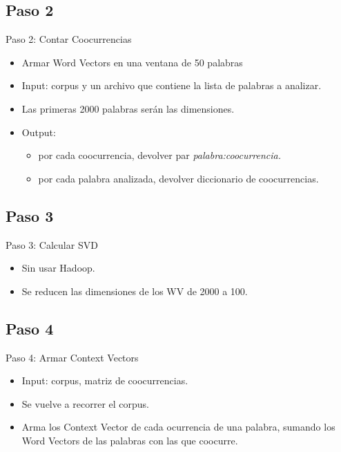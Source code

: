 \documentclass[xcolor=x11names,compress]{beamer}
\renewcommand{\(}{\begin{columns}}
\renewcommand{\)}{\end{columns}}
\newcommand{\<}[1]{\begin{column}{#1}}
\renewcommand{\>}{\end{column}}
\begin{document}
\subsection{Paso 2}
\begin{frame}{Paso 2: Contar Coocurrencias}
\begin{itemize}
\item Armar Word Vectors en una ventana de 50 palabras
\item Input: corpus y un archivo que contiene la lista de palabras a analizar.
\item Las primeras 2000 palabras serán las dimensiones.
\item Output:
\begin{itemize}
\item[Opción 1] por cada coocurrencia, devolver par \em palabra:coocurrencia\em.
\item[Opción 2] por cada palabra analizada, devolver diccionario de coocurrencias.
\end{itemize}
\end{itemize}
\end{frame}


\subsection{Paso 3}
\begin{frame}{Paso 3: Calcular SVD}
\begin{itemize}
\item Sin usar Hadoop.
\item Se reducen las dimensiones de los WV de 2000 a 100.
\end{itemize}
\end{frame}


\subsection{Paso 4}
\begin{frame}{Paso 4: Armar Context Vectors}
\begin{itemize}
\item Input: corpus, matriz de coocurrencias.
\item Se vuelve a recorrer el corpus.
\item Arma los Context Vector de cada ocurrencia de una palabra, sumando los Word Vectors de las palabras con las que coocurre.
\end{itemize}
\end{frame}
\end{document}
